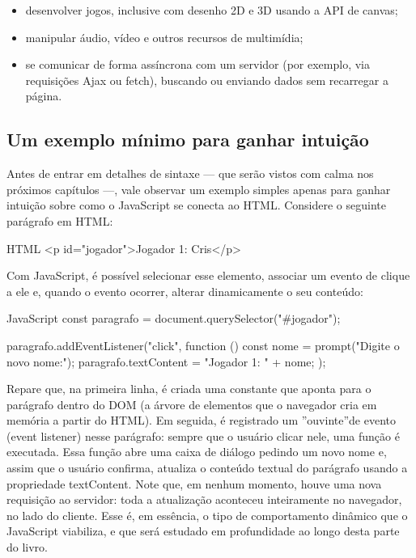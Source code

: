 \begin{itemize}
  \item desenvolver jogos, inclusive com desenho 2D e 3D usando a API de canvas;
\end{itemize}

\begin{itemize}
  \item manipular áudio, vídeo e outros recursos de multimídia;
\end{itemize}

\begin{itemize}
  \item se comunicar de forma assíncrona com um servidor (por exemplo, via requisições Ajax ou fetch), buscando ou enviando dados sem recarregar a página.
\end{itemize}

\subsection{Um exemplo mínimo para ganhar intuição}

Antes de entrar em detalhes de sintaxe — que serão vistos com calma nos próximos capítulos —, vale observar um exemplo simples apenas para ganhar intuição sobre como o JavaScript se conecta ao HTML. Considere o seguinte parágrafo em HTML:

\begin{codebox}{HTML}
<p id="jogador">Jogador 1: Cris</p>
\end{codebox}

Com JavaScript, é possível selecionar esse elemento, associar um evento de clique a ele e, quando o evento ocorrer, alterar dinamicamente o seu conteúdo:

\begin{codebox}{JavaScript}
const paragrafo = document.querySelector("#jogador");

paragrafo.addEventListener("click", function () {
  const nome = prompt("Digite o novo nome:");
  paragrafo.textContent = "Jogador 1: " + nome;
});
\end{codebox}

Repare que, na primeira linha, é criada uma constante que aponta para o parágrafo dentro do DOM (a árvore de elementos que o navegador cria em memória a partir do HTML). Em seguida, é registrado um ”ouvinte”de evento (event listener) nesse parágrafo: sempre que o usuário clicar nele, uma função é executada. Essa função abre uma caixa de diálogo pedindo um novo nome e, assim que o usuário confirma, atualiza o conteúdo textual do parágrafo usando a propriedade textContent. Note que, em nenhum momento, houve uma nova requisição ao servidor: toda a atualização aconteceu inteiramente no navegador, no lado do cliente. Esse é, em essência, o tipo de comportamento dinâmico que o JavaScript viabiliza, e que será estudado em profundidade ao longo desta parte do livro.

